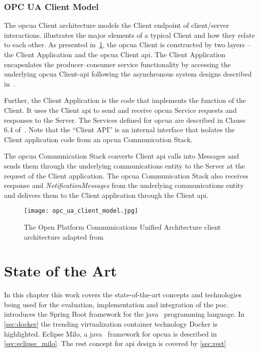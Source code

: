 \documentclass[
a4paper,
twoside,
headsepline,
cleardoublepage=empty,
parskip=half,
draft=false
]{scrbook}
\begin{document}
			\subsection{OPC UA Client Model}\label{subsec:opc_ua_client_model}

				The \gls{opcua} Client architecture models the Client endpoint of client/server interactions.
				 illustrates the major elements of a typical Client and how they relate to each other.
				As presented in~\cref{fig:opc_ua_client_model}, the \gls{opcua} Client is constructed by two layers -- the Client Application and the \gls{opcua} Client \gls{api}. The Client Application encapsulates the producer–consumer service functionality by accessing the underlying \gls{opcua} Client-\gls{api} following the asynchronous system designs described in~\cite{tanenbaum2007distributed}.
				
				Further, the Client Application is the code that implements the function of the Client.
				It uses the Client \gls{api} to send and receive \gls{opcua} Service requests and responses to the Server.
				The Services defined for \gls{opcua} are described in Clause 6.4 of~\cite{opcfoundation2017part4}.
				Note that the ``Client API'' is an internal interface that isolates the Client application code from an \gls{opcua} Communication Stack.
				
				The \gls{opcua} Communication Stack converts Client \gls{api} calls into Messages and sends them through the underlying communications entity to the Server at the request of the Client application.
				The \gls{opcua} Communication Stack also receives response and \textit{NotificationMessages} from the underlying communications entity and delivers them to the Client application through the Client \gls{api}.

				\begin{figure}[H]
					\centering
					\texttt{[image: opc\_ua\_client\_model.jpg]}
					\caption{The Open Platform Communications Unified Architecture client architecture adapted from~\cite{opcfoundation2017part1}}
					\label{fig:opc_ua_client_model}
				\end{figure}

	\chapter{State of the Art}\label{ch:state_of_the_art}
	
		In this chapter this work covers the state-of-the-art concepts and technologies being used for the evaluation, implementation and integration of the \gls{poc}.  introduces the Spring Boot framework for the \gls{java}~\cite{java2015} programming language. In \cref{sec:docker} the trending virtualization container technology Docker is highlighted. Eclipse Milo, a \gls{java}~\cite{java2015} framework for \gls{opcua} is described in \cref{sec:eclipse_milo}. The \gls{rest} concept for \gls{api} design is covered by \cref{sec:rest}
\end{document}
